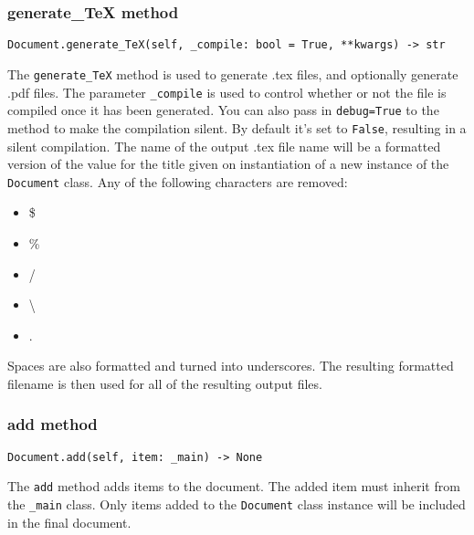 \documentclass{article}
\begin{document}
\subsubsection{generate\_TeX method}\label{subsubsec:generate_tex_method}
\begin{verbatim}
Document.generate_TeX(self, _compile: bool = True, **kwargs) -> str
\end{verbatim}
The \verb|generate_TeX| method is used to generate .tex files, and optionally generate .pdf files. The parameter \verb|_compile| is used to control whether or not the file is compiled once it has been generated.  You can also pass in \verb|debug=True| to the method to make the compilation silent. By default it's set to \verb|False|, resulting in a silent compilation.
The name of the output .tex file name will be a formatted version of the value for the title given on instantiation of a new instance of the \verb|Document| class. Any of the following characters are removed:\begin{itemize}
\item \$
\item \%
\item /
\item \textbackslash
\item .
\end{itemize}
Spaces are also formatted and turned into underscores. The resulting formatted filename is then used for all of the resulting output files.
\subsubsection{add method}\label{subsubsec:add_method}
\begin{verbatim}
Document.add(self, item: _main) -> None
\end{verbatim}
The \verb|add| method adds items to the document. The added item must inherit from the \verb|_main| class. Only items added to the \verb|Document| class instance will be included in the final document.
\end{document}
